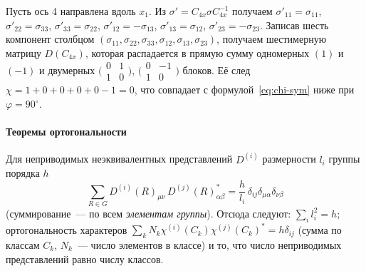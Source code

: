 \begin{primer}
Пусть ось 4 направлена вдоль $x_1$. Из $\sigma'=C_{4x}\sigma C_{4x}^{-1}$ получаем
$\sigma'_{11}=\sigma_{11}$, $\sigma'_{22}=\sigma_{33}$, $\sigma'_{33}=\sigma_{22}$, $\sigma'_{12}=-\sigma_{13}$,
$\sigma'_{13}=\sigma_{12}$, $\sigma'_{23}=-\sigma_{23}$. Записав шесть компонент столбцом
$(\sigma_{11},\sigma_{22},\sigma_{33},\sigma_{12},\sigma_{13},\sigma_{23})$, получаем
шестимерную матрицу $D(C_{4x})$, которая распадается в прямую сумму
одномерных $(1)$ и $(-1)$ и двумерных
$\bigl(\begin{smallmatrix}0&1\\1&0\end{smallmatrix}\bigr)$,
$\bigl(\begin{smallmatrix}0&-1\\1&0\end{smallmatrix}\bigr)$ блоков. Её след
$\chi=1+0+0+0+0-1=0$, что совпадает с формулой~\eqref{eq:chi-sym} ниже при
$\varphi=90^\circ$.
\end{primer}

\paragraph{Теоремы ортогональности}
Для неприводимых неэквивалентных представлений $D^{(i)}$ размерности $l_i$
группы порядка $h$
\begin{equation}\label{eq:orthogonality}
\sum_{R\in G}D^{(i)}(R)_{\mu\nu}\,D^{(j)}(R)^*_{\alpha\beta}=\frac h{l_i}\,\delta_{ij}\delta_{\mu\alpha}\delta_{\nu\beta}
\end{equation}
(суммирование~— по всем \emph{элементам группы}). Отсюда
следуют: $\sum_il_i^2=h$; ортогональность характеров
$\sum_kN_k\chi^{(i)}(C_k)\chi^{(j)}(C_k)^*=h\delta_{ij}$ (сумма по классам $C_k$, $N_k$~—
число элементов в классе) и то, что число неприводимых представлений
равно числу классов.

